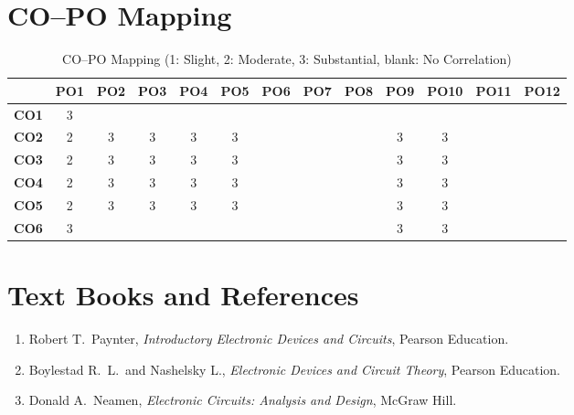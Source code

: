 \section*{CO--PO Mapping}
\begin{table}[H]
	\centering
	\renewcommand{\arraystretch}{1.3}
	\setlength{\tabcolsep}{4pt}
	\begin{tabular}{|c|c|c|c|c|c|c|c|c|c|c|c|c|}
		\hline
		& \textbf{PO1} & \textbf{PO2} & \textbf{PO3} & \textbf{PO4} & \textbf{PO5} & \textbf{PO6} & \textbf{PO7} & \textbf{PO8} & \textbf{PO9} & \textbf{PO10} & \textbf{PO11} & \textbf{PO12} \\
		\hline
		\textbf{CO1} & 3 & & & & & & & & & & & \\
		\hline
		\textbf{CO2} & 2 & 3 & 3 & 3 & 3 & & & & 3 & 3 & &  \\
		\hline
		\textbf{CO3} & 2 & 3 & 3 & 3 & 3 & & & & 3 & 3 & &  \\
		\hline
		\textbf{CO4} & 2 & 3 & 3 & 3 & 3 & & & & 3 & 3 & &  \\
		\hline
		\textbf{CO5} & 2 & 3 & 3 & 3 & 3 & & & & 3 & 3 & &  \\
		\hline
		\textbf{CO6} & 3 &   &   &   &   & & & & 3 & 3 & &  \\
		\hline
	\end{tabular}
	\caption{CO--PO Mapping (1: Slight, 2: Moderate, 3: Substantial, blank: No Correlation)}
\end{table}

\section*{Text Books and References}
\begin{enumerate}[label=\arabic*.]
	\item Robert T.\ Paynter, \textit{Introductory Electronic Devices and Circuits}, Pearson Education.
	\item Boylestad R.\ L.\ and Nashelsky L., \textit{Electronic Devices and Circuit Theory}, Pearson Education.
	\item Donald A.\ Neamen, \textit{Electronic Circuits: Analysis and Design}, McGraw Hill.
\end{enumerate}
